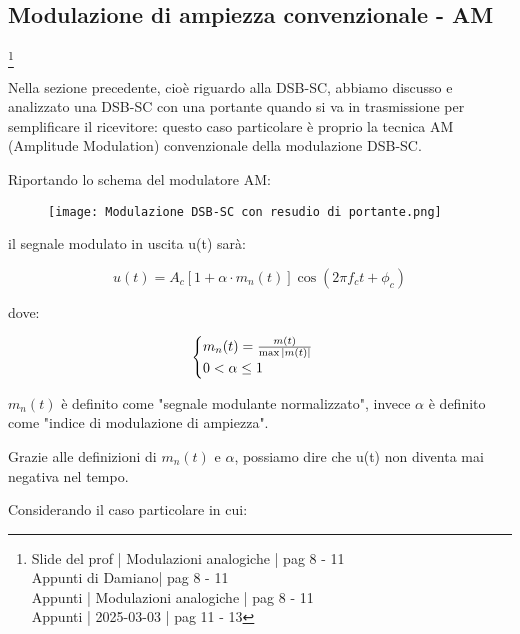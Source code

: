 \newpage 

\subsection{Modulazione di ampiezza convenzionale - AM}
\footnote{Slide del prof | Modulazioni analogiche | pag 8 - 11\\  
Appunti di Damiano| pag 8 - 11\\
Appunti | Modulazioni analogiche | pag 8 - 11\\
Appunti | 2025-03-03 | pag 11 - 13
}

Nella sezione precedente, cioè riguardo alla DSB-SC, abbiamo discusso e analizzato una DSB-SC con una portante quando si va in trasmissione per semplificare il ricevitore: 
questo caso particolare è proprio la tecnica AM (Amplitude Modulation) convenzionale della modulazione DSB-SC. \newline 

Riportando lo schema del modulatore AM: 

\begin{figure}[h]
    \centering
    \texttt{[image: Modulazione DSB-SC con resudio di portante.png]}
\end{figure} 

il segnale modulato in uscita u(t) sarà: 

{
    \Large 
    \begin{equation}
        u (t)
        = 
        A_c 
        [1 + \alpha \cdot m_n (t)] 
        \cos(2 \pi f_c t + \phi_c)
    \end{equation}
}

dove: 

{
    \Large 
    \begin{equation}
        \begin{cases}
            m_n(t) = \frac{m(t)}{\max \abs{m(t)}}
            \\
            0 < \alpha \le 1
        \end{cases}    
    \end{equation}
}

$m_n (t)$ è definito come "segnale modulante normalizzato", 
invece $\alpha$ è definito come "indice di modulazione di ampiezza". \newline 

Grazie alle definizioni di $m_n (t)$ e $\alpha$, possiamo dire che u(t) non diventa mai negativa nel tempo. \newline 

Considerando il caso particolare in cui:

